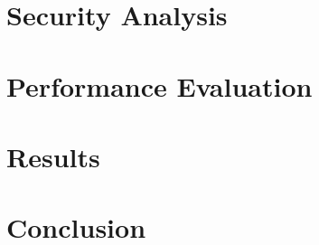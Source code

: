 \documentclass[conference]{IEEEtran}
\begin{document}
\section{Security Analysis}\label{Security Analysis}


\section{Performance Evaluation}\label{Results}


\section{Results}\label{Discussion}


\section{Conclusion}\label{Conclusion}








\end{document}
